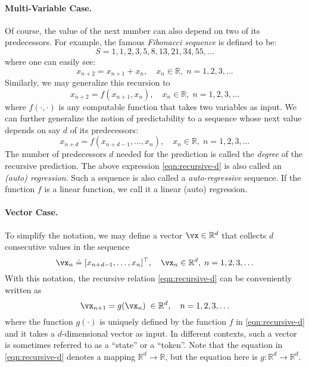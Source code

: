\documentclass[\toplevelprefix/book-main.tex]{subfiles}
\begin{document}
\paragraph{Multi-Variable Case.}
Of course, the value of the next number can also depend on two of its predecessors. For example, the famous {\em Fibonacci sequence} is defined to be:
\begin{equation}
    {S} = 1, 1, 2, 3, 5, 8, 13, 21, 34, 55, \ldots
\end{equation}
where one can easily see:
\begin{equation}
    x_{n+2} = x_{n+1} + x_{n}, \quad  x_n \in \mathbb{R}, \;  n = 1, 2, 3, \ldots
\end{equation}
Similarly, we may generalize this recursion to \begin{equation}
    x_{n+2} = f(x_{n+1}, x_{n}), \quad x_n \in \mathbb{R}, \;  n =  1, 2, 3, \ldots
\end{equation}
where $f(\cdot,\cdot)$ is any computable function that takes two variables as input. We can further generalize the notion of predictability to a sequence whose next value depends on say $d$ of its predecessors:
\begin{equation}
    x_{n+d} = f(x_{n+d-1}, \ldots,  x_{n}), \quad  x_n \in \mathbb{R}, \; n =  1, 2, 3, \ldots
    \label{eqn:recursive-d}
\end{equation}
The number of predecessors $d$ needed for the prediction is called the {\em degree} of the recursive prediction. The above expression \eqref{eqn:recursive-d} is also called an {\em (auto) regression}. Such a sequence is also called a {\em auto-regressive} sequence. If the function $f$ is a linear function, we call it a linear (auto) regression. 

\paragraph{Vector Case.} 
To simplify the notation, we may define a vector $\vx \in \mathbb{R}^d$ that collects $d$ consecutive values in the sequence  \begin{equation}
    \vx_n \doteq [x_{n+d-1}, \ldots,  x_{n}]^\top, \quad \vx_n \in \mathbb{R}^d, \; n = 1, 2, 3, \ldots
\end{equation}
With this notation, the recursive relation \eqref{eqn:recursive-d} can be conveniently written as
\begin{equation}
    \vx_{n+1} = g(\vx_{n}) \; \in \mathbb{R}^d, \quad n =  1, 2, 3, \ldots
    \label{eqn:recursive-v}
\end{equation}
where the function $g(\cdot)$ is uniquely defined by the function $f$ in \eqref{eqn:recursive-d} and it  takes a $d$-dimensional vector as input. In different contexts, such a vector is sometimes referred to as a ``state'' or a ``token''. Note that the equation in \eqref{eqn:recursive-d} denotes a mapping $\mathbb{R}^d \rightarrow \mathbb{R}$, but the equation here is $g: \mathbb{R}^d \rightarrow \mathbb{R}^d$.
\end{document}
